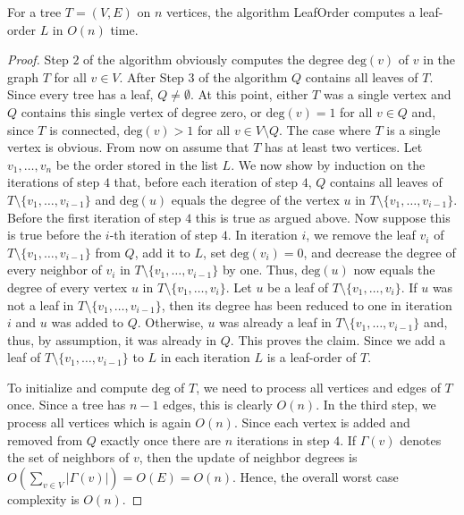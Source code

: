 \documentclass[english,a4paper,nolineno,cleveref]{socg-lipics-v2021}
\begin{document}
\begin{proposition}\label{prop:leaf_order}
For a tree $T=(V,E)$ on $n$ vertices, the algorithm {\sc LeafOrder} computes a leaf-order $L$ in $O(n)$ time.
\end{proposition}

\begin{proof}
Step $2$ of the algorithm obviously computes the degree $\text{deg}(v)$ of $v$ in the graph $T$ for all $v\in V$.
After Step 3 of the algorithm $Q$ contains all leaves of $T$. Since every tree has a leaf, $Q\neq\emptyset$. At this point, either $T$ was a single vertex and $Q$ contains this single vertex of degree zero, or $\text{deg}(v)=1$ for all $v\in Q$ and, since $T$ is connected, $\text{deg}(v)>1$ for all $v\in V\setminus Q$. The case where $T$ is a single vertex is obvious. From now on assume that $T$ has at least two vertices. Let $v_1,\ldots,v_n$ be the order stored in the list $L$. We now show by induction on the iterations of step $4$ that, before each iteration of step $4$, $Q$ contains all leaves of $T\setminus \{v_1,\ldots,v_{i\minus 1}\}$ and $\text{deg}(u)$ equals the degree of the vertex $u$ in $T\setminus \{v_1,\ldots,v_{i\minus 1}\}$. Before the first iteration of step $4$ this is true as argued above. Now suppose this is true before the $i$-th iteration of step $4$. In iteration $i$, we remove the leaf $v_i$ of $T\setminus \{v_1,\ldots,v_{i\minus 1}\}$ from $Q$, add it to $L$, set $\text{deg}(v_i)=0$, and decrease the degree of every neighbor of $v_i$ in $T\setminus \{v_1,\ldots,v_{i\minus 1}\}$ by one. Thus, $\text{deg}(u)$ now equals the degree of every vertex $u$ in $T\setminus \{v_1,\ldots,v_{i}\}$. Let $u$ be a leaf of $T\setminus \{v_1,\ldots,v_{i}\}$. If $u$ was not a leaf in $T\setminus \{v_1,\ldots,v_{i\minus 1}\}$, then its degree has been reduced to one in iteration $i$ and $u$ was added to $Q$. Otherwise, $u$ was already a leaf in $T\setminus \{v_1,\ldots,v_{i\minus 1}\}$ and, thus, by assumption, it was already in $Q$. This proves the claim. Since we add a leaf of $T\setminus \{v_1,\ldots,v_{i\minus 1}\}$ to $L$ in each iteration $L$ is a leaf-order of $T$.

To initialize and compute $\text{deg}$ of $T$, we need to process all vertices and edges of $T$ once. Since a tree has $n-1$ edges, this is clearly $O(n)$. In the third step, we process all vertices which is again $O(n)$. Since each vertex is added and removed from $Q$ exactly once there are $n$ iterations in step $4$. If $\Gamma(v)$ denotes the set of neighbors of $v$, then the update of neighbor degrees is $O(\sum_{v\in V}\vert\Gamma(v)\vert)=O(E)=O(n)$. Hence, the overall worst case complexity is $O(n)$. 
\end{proof}
\end{document}
